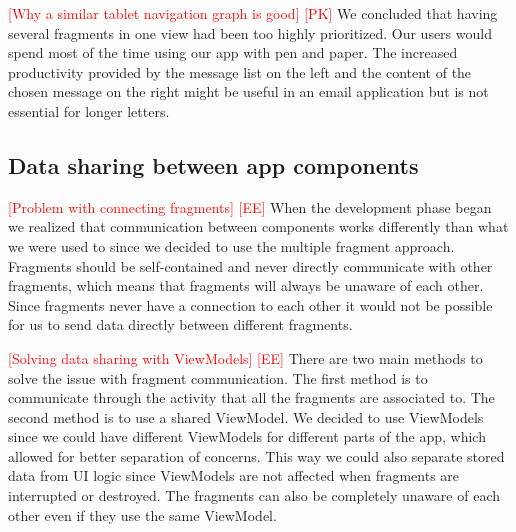 \documentclass[acmlarge, review=false, screen=true]{acmart}
\begin{document}
      \textcolor{red}{[Why a similar tablet navigation graph is good] [PK]} \newline
      We concluded that having several fragments in one view had been too highly prioritized. Our users would spend most of the time using our app with pen and paper. The increased productivity provided by the message list on the left and the content of the chosen message on the right might be useful in an email application but is not essential for longer letters. 

    \subsection{Data sharing between app components}
      \textcolor{red}{[Problem with connecting fragments] [EE]} \newline
      When the development phase began we realized that communication between components works differently than what we were used to since we decided to use the multiple fragment approach. Fragments should be self-contained and never directly communicate with other fragments\cite{fragmentcommunication}, which means that fragments will always be unaware of each other. Since fragments never have a connection to each other it would not be possible for us to send data directly between different fragments.

      \textcolor{red}{[Solving data sharing with ViewModels] [EE]} \newline
      There are two main methods to solve the issue with fragment communication. The first method is to communicate through the activity that all the fragments are associated to. The second method is to use a shared ViewModel. We decided to use ViewModels since we could have different ViewModels for different parts of the app, which allowed for better separation of concerns. This way we could also separate stored data from UI logic since ViewModels are not affected when fragments are interrupted or destroyed\cite{viewmodel}. The fragments can also be completely unaware of each other even if they use the same ViewModel.
\end{document}
